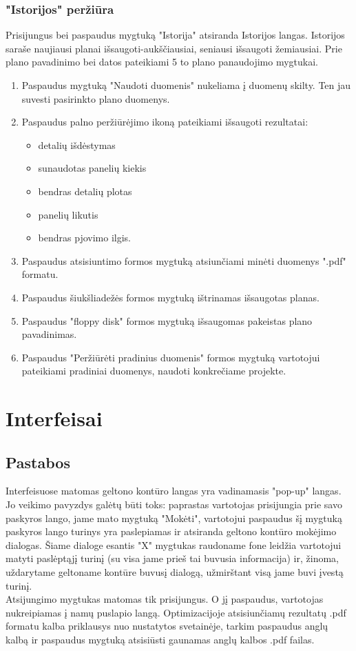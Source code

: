 \documentclass[a4paper,12pt]{article}
\begin{document}
\subsubsection{"Istorijos" peržiūra}
Prisijungus bei paspaudus mygtuką "Istorija" atsiranda Istorijos langas.
Istorijos saraše naujiausi planai išsaugoti-aukščiausiai, seniausi išsaugoti žemiausiai.
Prie plano pavadinimo bei datos pateikiami 5 to plano panaudojimo mygtukai.
\begin{enumerate}
	\item Paspaudus mygtuką "Naudoti duomenis" nukeliama į duomenų skilty.
		Ten jau suvesti pasirinkto plano duomenys.
	\item Paspaudus palno peržiūrėjimo ikoną pateikiami išsaugoti rezultatai:
		\begin{itemize}
			\item detalių išdėstymas
			\item sunaudotas panelių kiekis
			\item bendras detalių plotas
			\item panelių likutis
			\item bendras pjovimo ilgis.
		\end{itemize}
	\item Paspaudus atsisiuntimo formos mygtuką atsiunčiami minėti duomenys ".pdf" formatu.
	\item Paspaudus šiukšliadežės formos mygtuką ištrinamas išsaugotas planas.
	\item Paspaudus "floppy disk" formos mygtuką išsaugomas pakeistas plano pavadinimas.
	\item Paspaudus "Peržiūrėti pradinius duomenis" formos mygtuką vartotojui pateikiami pradiniai duomenys, naudoti konkrečiame projekte.
\end{enumerate}
\clearpage

\section{Interfeisai}

\subsection{Pastabos}
Interfeisuose matomas geltono kontūro langas yra vadinamasis "pop-up" langas. Jo veikimo pavyzdys galėtų būti toks: paprastas vartotojas prisijungia prie savo paskyros lango, jame mato mygtuką "Mokėti", vartotojui paspaudus šį mygtuką paskyros lango turinys yra paslepiamas ir atsiranda geltono kontūro mokėjimo dialogas. Šiame dialoge esantis "X" mygtukas raudoname fone leidžia vartotojui matyti paslėptąjį turinį (su visa jame prieš tai buvusia informacija) ir, žinoma, uždarytame geltoname kontūre buvusį dialogą, užmirštant visą jame buvi įvestą turinį.\\
Atsijungimo mygtukas matomas tik prisijungus. O jį paspaudus, vartotojas nukreipiamas į namų puslapio langą.
Optimizacijoje atsisiunčiamų rezultatų .pdf formatu kalba priklausys nuo nustatytos svetainėje, tarkim paspaudus anglų kalbą ir paspaudus mygtuką atsisiūsti gaunamas anglų kalbos .pdf failas.
\end{document}
